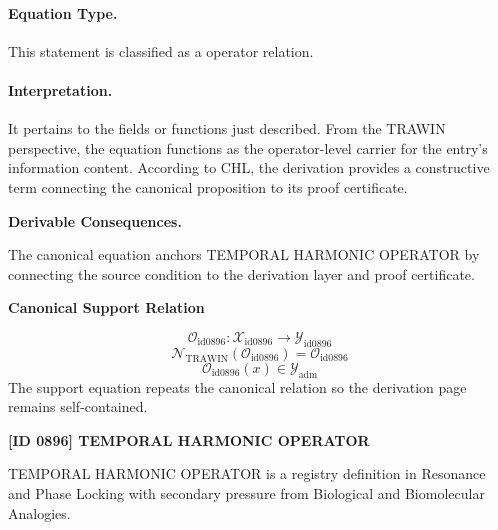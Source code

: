 \paragraph{Equation Type.}
This statement is classified as a operator relation.

\paragraph{Interpretation.}
It pertains to the fields or functions just described. From the TRAWIN perspective, the equation functions as the operator-level carrier for the entry’s information content. According to CHL, the derivation provides a constructive term connecting the canonical proposition to its proof certificate.

\par\vspace{0.35em}
\noindent\textbf{Derivable Consequences.}\quad
\begingroup
\footnotesize
\raggedright
The canonical equation anchors TEMPORAL HARMONIC OPERATOR by connecting the source condition to the derivation layer and proof certificate.
\par\endgroup

\noindent\textbf{Canonical Support Relation}\par
\[
\mathcal{O}_{\mathrm{id0896}}:\mathcal{X}_{\mathrm{id0896}}\longrightarrow\mathcal{Y}_{\mathrm{id0896}}
\]
\[
\mathcal{N}_{\mathrm{TRAWIN}}(\mathcal{O}_{\mathrm{id0896}})=\mathcal{O}_{\mathrm{id0896}}
\]
\[
\mathcal{O}_{\mathrm{id0896}}(x)\in\mathcal{Y}_{\mathrm{adm}}
\]
\noindent The support equation repeats the canonical relation so the derivation page remains self-contained.\par

\clearpage
\noindent\textbf{[ID 0896] TEMPORAL HARMONIC OPERATOR}\par
\vspace{0.35em}
\begingroup\small
{}
TEMPORAL HARMONIC OPERATOR is a registry definition in Resonance and Phase Locking with secondary pressure from Biological and Biomolecular Analogies.

